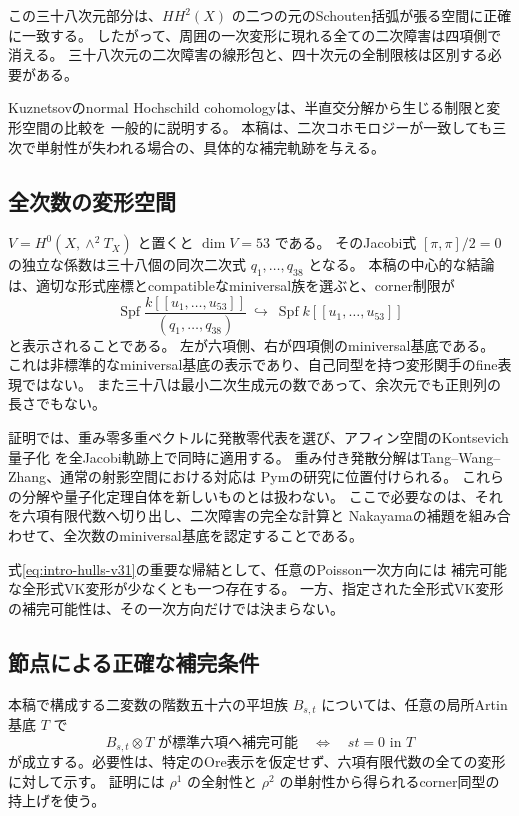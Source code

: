 この三十八次元部分は、$HH^2(X)$ の二つの元のSchouten括弧が張る空間に正確に一致する。
したがって、周囲の一次変形に現れる全ての二次障害は四項側で消える。
三十八次元の二次障害の線形包と、四十次元の全制限核は区別する必要がある。

Kuznetsovのnormal Hochschild cohomologyは、半直交分解から生じる制限と変形空間の比較を
一般的に説明する\cite[\S4.2]{Kuznetsov}。
本稿は、二次コホモロジーが一致しても三次で単射性が失われる場合の、具体的な補完軌跡を与える。

\subsection{全次数の変形空間}

$V=H^0(X,\wedge^2T_X)$ と置くと $\dim V=53$ である。
そのJacobi式 $[\pi,\pi]/2=0$ の独立な係数は三十八個の同次二次式
$q_1,\ldots,q_{38}$ となる。
本稿の中心的な結論は、適切な形式座標とcompatibleなminiversal族を選ぶと、corner制限が
\begin{equation}\label{eq:intro-hulls-v31}
 \operatorname{Spf}\frac{k[[u_1,\ldots,u_{53}]]}{(q_1,\ldots,q_{38})}
 \ \hookrightarrow\ \operatorname{Spf}k[[u_1,\ldots,u_{53}]]
\end{equation}
と表示されることである。
左が六項側、右が四項側のminiversal基底である。
これは非標準的なminiversal基底の表示であり、自己同型を持つ変形関手のfine表現ではない。
また三十八は最小二次生成元の数であって、余次元でも正則列の長さでもない。

証明では、重み零多重ベクトルに発散零代表を選び、アフィン空間のKontsevich量子化
\cite{Kontsevich}を全Jacobi軌跡上で同時に適用する。
重み付き発散分解はTang--Wang--Zhang\cite{TWW}、通常の射影空間における対応は
Pym\cite[\S2.2]{Pym}の研究に位置付けられる。
これらの分解や量子化定理自体を新しいものとは扱わない。
ここで必要なのは、それを六項有限代数へ切り出し、二次障害の完全な計算と
Nakayamaの補題を組み合わせて、全次数のminiversal基底を認定することである。

式\eqref{eq:intro-hulls-v31}の重要な帰結として、任意のPoisson一次方向には
補完可能な全形式VK変形が少なくとも一つ存在する。
一方、指定された全形式VK変形の補完可能性は、その一次方向だけでは決まらない。

\subsection{節点による正確な補完条件}

本稿で構成する二変数の階数五十六の平坦族 $B_{s,t}$ については、任意の局所Artin基底 $T$ で
\[
 B_{s,t}\otimes T\text{ が標準六項へ補完可能}
 \quad\Longleftrightarrow\quad st=0\text{ in }T
\]
が成立する。必要性は、特定のOre表示を仮定せず、六項有限代数の全ての変形に対して示す。
証明には $\rho^1$ の全射性と $\rho^2$ の単射性から得られるcorner同型の持上げを使う。

